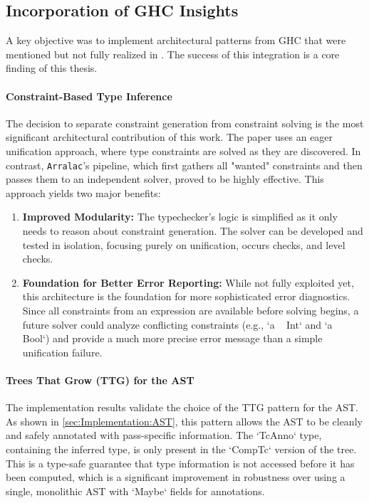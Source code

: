 \subsection{Incorporation of GHC Insights}
A key objective was to implement architectural patterns from GHC that were mentioned but not fully realized in \cite{jones-practical-2007}. The success of this integration is a core finding of this thesis.

\paragraph{Constraint-Based Type Inference}
The decision to separate constraint generation from constraint solving is the most significant architectural contribution of this work. The paper \cite{jones-practical-2007} uses an eager unification approach, where type constraints are solved as they are discovered. In contrast, \texttt{Arralac}'s pipeline, which first gathers all "wanted" constraints and then passes them to an independent solver, proved to be highly effective. This approach yields two major benefits:
\begin{enumerate}
    \item \textbf{Improved Modularity:} The typechecker's logic is simplified as it only needs to reason about constraint generation. The solver can be developed and tested in isolation, focusing purely on unification, occurs checks, and level checks.
    \item \textbf{Foundation for Better Error Reporting:} While not fully exploited yet, this architecture is the foundation for more sophisticated error diagnostics. Since all constraints from an expression are available before solving begins, a future solver could analyze conflicting constraints (e.g., `a ~ Int` and `a ~ Bool`) and provide a much more precise error message than a simple unification failure.
\end{enumerate}

\paragraph{Trees That Grow (TTG) for the AST}
The implementation results validate the choice of the TTG pattern for the AST. As shown in \cref{sec:Implementation:AST}, this pattern allows the AST to be cleanly and safely annotated with pass-specific information. The `TcAnno` type, containing the inferred type, is only present in the `CompTc` version of the tree. This is a type-safe guarantee that type information is not accessed before it has been computed, which is a significant improvement in robustness over using a single, monolithic AST with `Maybe` fields for annotations.

